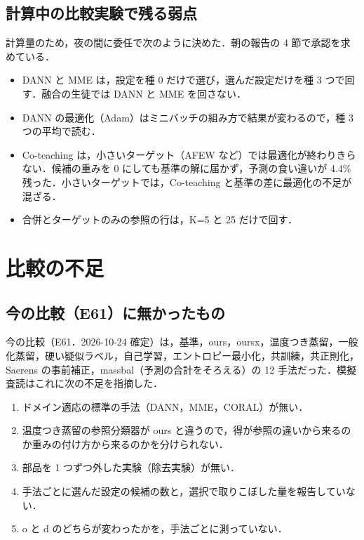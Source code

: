 \documentclass[a4paper,11pt]{ltjsarticle}
\begin{document}
\subsection{計算中の比較実験で残る弱点}

計算量のため，夜の間に委任で次のように決めた．朝の報告の 4 節で承認を求めている．

\begin{itemize}
\item DANN と MME は，設定を種 0 だけで選び，選んだ設定だけを種 3 つで回す．融合の生徒では DANN と MME を回さない．
\item DANN の最適化（Adam）はミニバッチの組み方で結果が変わるので，種 3 つの平均で読む．
\item Co-teaching は，小さいターゲット（AFEW など）では最適化が終わりきらない．候補の重みを 0 にしても基準の解に届かず，予測の食い違いが 4.4\% 残った．小さいターゲットでは，Co-teaching と基準の差に最適化の不足が混ざる．
\item 合併とターゲットのみの参照の行は，K=5 と 25 だけで回す．
\end{itemize}

\section{比較の不足}

\subsection{今の比較（E61）に無かったもの}

今の比較（E61．2026-10-24 確定）は，基準，ours，oursx，温度つき蒸留，一般化蒸留，硬い疑似ラベル，自己学習，エントロピー最小化，共訓練，共正則化，Saerens の事前補正，massbal（予測の合計をそろえる）の 12 手法だった．模擬査読はこれに次の不足を指摘した．

\begin{enumerate}
\item ドメイン適応の標準の手法（DANN，MME，CORAL）が無い．
\item 温度つき蒸留の参照分類器が ours と違うので，得が参照の違いから来るのか重みの付け方から来るのかを分けられない．
\item 部品を 1 つずつ外した実験（除去実験）が無い．
\item 手法ごとに選んだ設定の候補の数と，選択で取りこぼした量を報告していない．
\item o と d のどちらが変わったかを，手法ごとに測っていない．
\end{enumerate}
\end{document}
